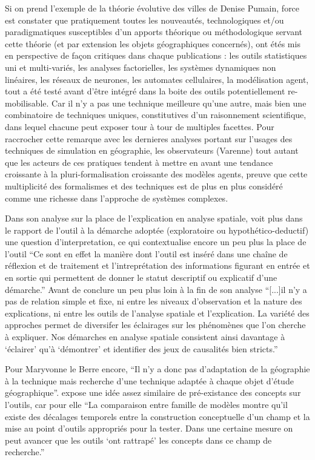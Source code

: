 Si on prend l'exemple de la théorie évolutive des villes de Denise Pumain, force est constater que pratiquement toutes les nouveautés, technologiques et/ou paradigmatiques susceptibles d'un apports théorique ou méthodologique servant cette théorie (et par extension les objets géographiques concernés), ont étés mis en perspective de façon critiques dans chaque publications : les outils statistiques uni et multi-variés, les analyses factorielles, les systèmes dynamiques non linéaires, les réseaux de neurones, les automates cellulaires, la modélisation agent, tout a été testé avant d'être intégré dans la boite des outils potentiellement re-mobilisable. Car il n'y a pas une technique meilleure qu'une autre, mais bien une combinatoire de techniques uniques, constitutives d'un raisonnement scientifique, dans lequel chacune peut exposer tour à tour de multiples facettes. Pour raccrocher cette remarque avec les dernieres analyses portant sur l'usages des techniques de simulation en géographie, les observateurs (Varenne) tout autant que les acteurs \autocite{Sanders2013} de ces pratiques tendent à mettre en avant une tendance croissante à la pluri-formalisation croissante des modèles agents, preuve que cette multiplicité des formalismes et des techniques est de plus en plus considéré comme une richesse dans l'approche de systèmes complexes.

Dans son analyse sur la place de l'explication en analyse spatiale, \textcite{Sanders2000} voit plus dans le rapport de l'outil à la démarche adoptée (exploratoire ou hypothético-deductif) une question d'interpretation, ce qui contextualise encore un peu plus la place de l'outil \enquote{Ce sont en effet la manière dont l'outil est inséré dans une chaîne de réflexion et de traitement et l'intreprétation des informations figurant en entrée et en sortie qui permettent de donner le statut descriptif ou explicatif d'une démarche.} Avant de conclure un peu plus loin à la fin de son analyse \enquote{[...]il n'y a pas de relation simple et fixe, ni entre les niveaux d'observation et la nature des explications, ni entre les outils de l'analyse spatiale et l'explication. La variété des approches permet de diversifer les éclairages sur les phénomènes que l'on cherche à expliquer. Nos démarches en analyse spatiale consistent ainsi davantage à \enquote{éclairer} qu'à \enquote{démontrer} et identifier des jeux de causalités bien stricts.}

Pour Maryvonne le Berre encore, \enquote{Il n’y a donc pas d’adaptation de la géographie à la technique mais recherche d’une technique adaptée à chaque objet d’étude géographique}. \textcite{Sanders2013} expose une idée assez similaire de pré-existance des concepts sur l'outils, car pour elle \enquote{La comparaison entre famille de modèles montre qu'il existe des décalages temporels entre la construction conceptuelle d'un champ et la mise au point d'outils appropriés pour la tester. Dans une certaine mesure on peut avancer que les outils \enquote{ont rattrapé} les concepts dans ce champ de recherche.}  


